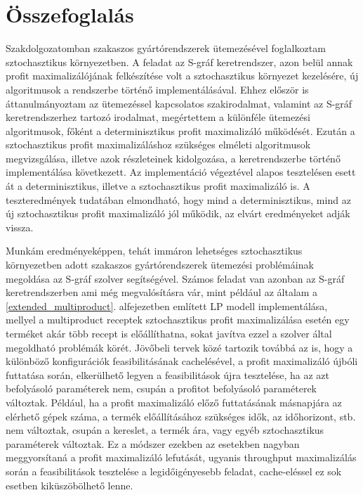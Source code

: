 \chapter{Összefoglalás} \label{Summary}
Szakdolgozatomban szakaszos gyártórendszerek ütemezésével foglalkoztam sztochasztikus környezetben.
A feladat az S-gráf keretrendszer, azon belül annak profit maximalizálójának felkészítése volt a sztochasztikus környezet kezelésére, új algoritmusok a rendszerbe történő implementálásával.
Ehhez először is áttanulmányoztam az ütemezéssel kapcsolatos szakirodalmat, valamint az S-gráf keretrendszerhez tartozó irodalmat, megértettem a különféle ütemezési algoritmusok, főként a determinisztikus profit maximalizáló működését.
Ezután a sztochasztikus profit maximalizáláshoz szükséges elméleti algoritmusok megvizsgálása, illetve azok részleteinek kidolgozása, a keretrendszerbe történő implementálása következett.
Az implementáció végeztével alapos tesztelésen esett át a determinisztikus, illetve a sztochasztikus profit maximalizáló is.
A teszteredmények tudatában elmondható, hogy mind a determinisztikus, mind az új sztochasztikus profit maximalizáló jól működik, az elvárt eredményeket adják vissza.
 
Munkám eredményeképpen, tehát immáron lehetséges sztochasztikus környezetben adott szakaszos gyártórendszerek ütemezési problémáinak megoldása az S-gráf szolver segítségével.
Számos feladat van azonban az S-gráf keretrendszerben ami még megvalósításra vár, mint például az általam a \ref{extended_multiproduct}. alfejezetben említett LP modell implementálása, mellyel a multiproduct receptek sztochasztikus profit maximalizálása esetén egy terméket akár több recept is előállíthatna, sokat javítva ezzel a szolver által megoldható problémák körét.
Jövőbeli tervek közé tartozik továbbá az is, hogy a különböző konfigurációk feasibilitásának cachelésével, a profit maximalizáló újbóli futtatása során, elkerülhető legyen a feasibilitások újra tesztelése, ha az azt befolyásoló paraméterek nem, csupán a profitot befolyásoló paraméterek változtak.
Például, ha a profit maximalizáló előző futtatásának másnapjára az elérhető gépek száma, a termék előállításához szükséges idők, az időhorizont, stb. nem változtak, csupán a kereslet, a termék ára, vagy egyéb sztochasztikus paraméterek változtak.
Ez a módszer ezekben az esetekben nagyban meggyorsítaná a profit maximalizáló lefutását, ugyanis throughput maximalizálás során a feasibilitások tesztelése a legidőigényesebb feladat, cache-eléssel ez sok esetben kiküszöbölhető lenne.